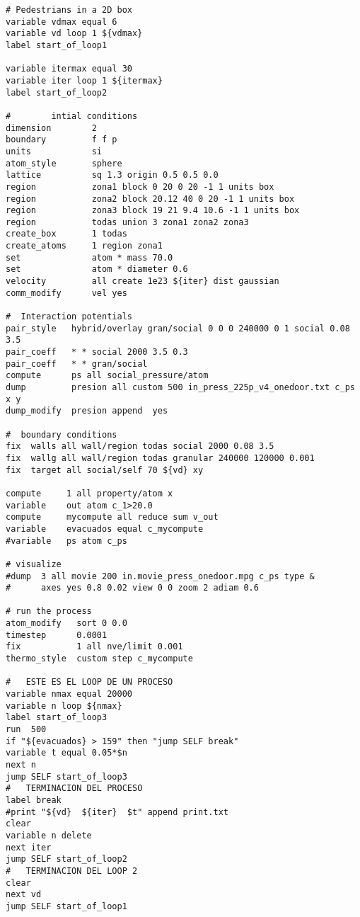 \begin{verbatim}
# Pedestrians in a 2D box
variable vdmax equal 6
variable vd loop 1 ${vdmax}
label start_of_loop1

variable itermax equal 30
variable iter loop 1 ${itermax}
label start_of_loop2

# 		 intial conditions
dimension        2
boundary         f f p
units            si
atom_style       sphere
lattice          sq 1.3 origin 0.5 0.5 0.0
region           zona1 block 0 20 0 20 -1 1 units box
region           zona2 block 20.12 40 0 20 -1 1 units box
region           zona3 block 19 21 9.4 10.6 -1 1 units box
region           todas union 3 zona1 zona2 zona3
create_box       1 todas
create_atoms     1 region zona1
set              atom * mass 70.0
set              atom * diameter 0.6
velocity         all create 1e23 ${iter} dist gaussian
comm_modify      vel yes

#  Interaction potentials
pair_style   hybrid/overlay gran/social 0 0 0 240000 0 1 social 0.08 3.5
pair_coeff   * * social 2000 3.5 0.3
pair_coeff   * * gran/social
compute      ps all social_pressure/atom
dump         presion all custom 500 in_press_225p_v4_onedoor.txt c_ps x y
dump_modify  presion append  yes

#  boundary conditions
fix  walls all wall/region todas social 2000 0.08 3.5
fix  wallg all wall/region todas granular 240000 120000 0.001    
fix  target all social/self 70 ${vd} xy          

compute     1 all property/atom x
variable    out atom c_1>20.0
compute     mycompute all reduce sum v_out
variable    evacuados equal c_mycompute
#variable   ps atom c_ps

# visualize
#dump  3 all movie 200 in.movie_press_onedoor.mpg c_ps type &
#      axes yes 0.8 0.02 view 0 0 zoom 2 adiam 0.6

# run the process
atom_modify   sort 0 0.0
timestep      0.0001
fix           1 all nve/limit 0.001
thermo_style  custom step c_mycompute

#	ESTE ES EL LOOP DE UN PROCESO
variable nmax equal 20000
variable n loop ${nmax}
label start_of_loop3
run  500
if "${evacuados} > 159" then "jump SELF break"
variable t equal 0.05*$n
next n
jump SELF start_of_loop3
#	TERMINACION DEL PROCESO
label break
#print "${vd}  ${iter}  $t" append print.txt
clear
variable n delete
next iter
jump SELF start_of_loop2
#	TERMINACION DEL LOOP 2
clear
next vd
jump SELF start_of_loop1
\end{verbatim}


